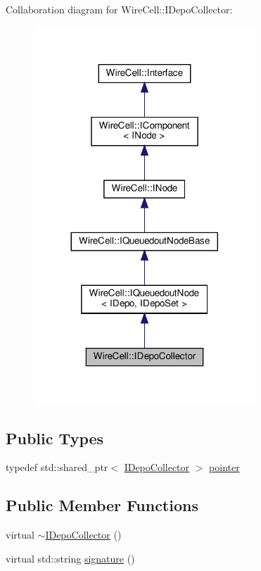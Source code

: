 Collaboration diagram for Wire\+Cell\+:\+:I\+Depo\+Collector\+:
\nopagebreak
\begin{figure}[H]
\begin{center}
\leavevmode
\includegraphics[width=236pt]{class_wire_cell_1_1_i_depo_collector__coll__graph}
\end{center}
\end{figure}
\subsection*{Public Types}
\begin{DoxyCompactItemize}
\item 
typedef std\+::shared\+\_\+ptr$<$ \hyperlink{class_wire_cell_1_1_i_depo_collector}{I\+Depo\+Collector} $>$ \hyperlink{class_wire_cell_1_1_i_depo_collector_a90a08b7b30e80a1a2d5ce1367cc2d698}{pointer}
\end{DoxyCompactItemize}
\subsection*{Public Member Functions}
\begin{DoxyCompactItemize}
\item 
virtual \hyperlink{class_wire_cell_1_1_i_depo_collector_a3200cc7cb980eddbffc4bd7fa3ebb11d}{$\sim$\+I\+Depo\+Collector} ()
\item 
virtual std\+::string \hyperlink{class_wire_cell_1_1_i_depo_collector_a0ea88b8d3e723800a2bbe3e4bd0c9793}{signature} ()
\end{DoxyCompactItemize}


